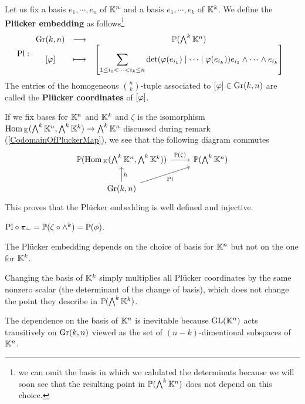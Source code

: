 \begin{definition}
Let us fix a basis $e_1,\cdots, e_n$ of $\mathbb{K}^n$ and a basis $e_1,\cdots, e_k$ of $\mathbb{K}^k$. We define the \textbf{Pl\"ucker embedding} as follows\footnote{we can omit the basis in which we calulated the determinats because we will soon see that the resulting point in $\mathbb{P}(\bigwedge^k\mathbb{K}^n)$ does not depend on this choice.}
\[\mathrm{Pl}:\begin{array}{ccc} {\mathrm{Gr}(k,n)} & \longrightarrow & {\mathbb{P}(\bigwedge^k\mathbb{K}^n)}\\ {[\varphi]} & \longmapsto & {\displaystyle\left[{\sum_{1\leq i_1<\cdots<i_k\leq n}\det(\varphi(e_{i_1})\mid\cdots\mid\varphi(e_{i_k}))e_{i_1}\wedge\cdots\wedge e_{i_k}}\right]} \end{array}\]
The entries of the homogeneous $\binom nk$-tuple associated to $[\varphi]\in \mathrm{Gr}(k,n)$ are called the \textbf{Pl\"ucker coordinates} of $[\varphi]$. 
\end{definition}

\begin{remark}
If we fix bases for $\mathbb{K}^n$ and $\mathbb{K}^k$ and $\zeta$ is the isomorphism $\mathrm{Hom}\,_{\mathbb{K}}(\bigwedge^k\mathbb{K}^n,\bigwedge^k\mathbb{K}^k)\to \bigwedge^k\mathbb{K}^n$ discussed during remark (\ref{CodomainOfPluckerMap}), we see that the following diagram commutes
\[\begin{tikzcd}
	{\Pj(\Hom_\K(\bigwedge^k\K^n,\bigwedge^k\K^k))} & {\Pj(\bigwedge^k\K^n)} \\
	{\Gr(k,n)}
	\arrow["h"', from=2-1, to=1-1]
	\arrow["{\Pj(\zeta)}", from=1-1, to=1-2]
	\arrow["{\Pl}"', from=2-1, to=1-2]
\end{tikzcd}\]
This proves that the Pl\"ucker embedding is well defined and injective.
\end{remark}

\begin{remark}
$\mathrm{Pl}\circ \pi_\sim=\mathbb{P}(\zeta\circ\wedge^k)=\mathbb{P}(\phi)$.
\end{remark}


\begin{remark}
The Pl\"ucker embedding depends on the choice of basis for $\mathbb{K}^n$ but not on the one for $\mathbb{K}^k$. 

Changing the basis of $\mathbb{K}^k$ simply multiplies all Pl\"ucker coordinates by the same nonzero scalar (the determinant of the change of basis), which does not change the point they describe in $\mathbb{P}(\bigwedge^k\mathbb{K}^k)$.

The dependence on the basis of $\mathbb{K}^n$ is inevitable because $\mathrm{GL}(\mathbb{K}^n)$ acts transitively on $\mathrm{Gr}(k,n)$ viewed as the set of $(n-k)$-dimentional subspaces of $\mathbb{K}^n$.
\end{remark}

